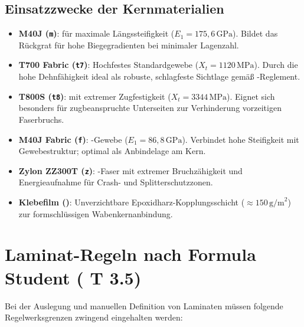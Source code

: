 \subsection*{Einsatzzwecke der Kernmaterialien}
\begin{itemize}
    \item \textbf{M40J  (\texttt{m})}:  für maximale Längssteifigkeit ($E_1 = 175{,}6\,\text{GPa}$). Bildet das Rückgrat für hohe Biegegradienten bei minimaler Lagenzahl.
    \item \textbf{T700 Fabric (\texttt{t7})}: Hochfestes Standardgewebe ($X_t = 1120\,\text{MPa}$). Durch die hohe Dehnfähigkeit ideal als robuste, schlagfeste Sichtlage gemäß -Reglement.
    \item \textbf{T800S  (\texttt{t8})}:  mit extremer Zugfestigkeit ($X_t = 3344\,\text{MPa}$). Eignet sich besonders für zugbeanspruchte Unterseiten zur Verhinderung vorzeitigen Faserbruchs.
    \item \textbf{M40J Fabric (\texttt{f})}: -Gewebe ($E_1 = 86{,}8\,\text{GPa}$). Verbindet hohe Steifigkeit mit Gewebestruktur; optimal als Anbindelage am Kern.
    \item \textbf{Zylon ZZ300T (\texttt{z})}: -Faser mit extremer Bruchzähigkeit und Energieaufnahme für Crash- und Splitterschutzzonen.
    \item \textbf{Klebefilm ()}: Unverzichtbare Epoxidharz-Kopplungsschicht ($\approx 150\,\text{g/m}^2$) zur formschlüssigen Wabenkernanbindung.
\end{itemize}

\section{Laminat-Regeln nach Formula Student (\texorpdfstring{}{FSG} T 3.5)} \label{sec:fsg_rules}

Bei der Auslegung und manuellen Definition von Laminaten müssen folgende Regelwerksgrenzen zwingend eingehalten werden:

